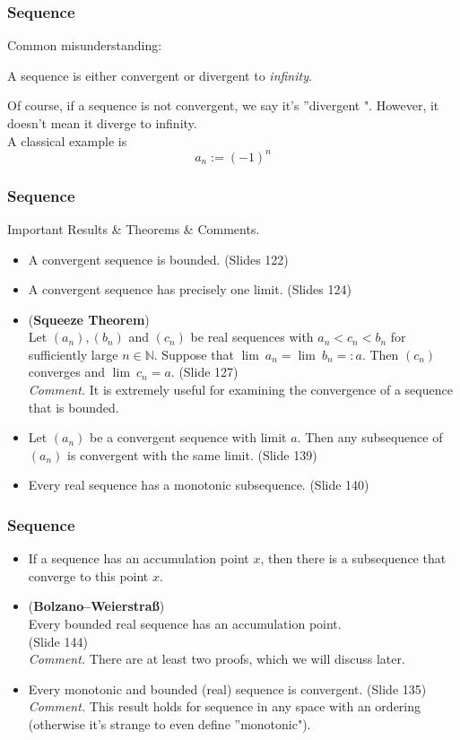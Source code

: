 \documentclass[12pt, t]{beamer}
\renewcommand{\emph}[1]{{\color{Turquoise3}\textsl{#1}}}
\begin{document}
\begin{frame}
    \frametitle{Sequence}
Common misunderstanding:
\begin{center}
    A sequence is either convergent or divergent to \emph{infinity}.
\end{center}
\hspace{1em} Of course, if a sequence is not convergent, we say it's ''divergent ". However, 
it doesn't mean it diverge to infinity.\\
\hspace{1em}A classical example is 
\begin{equation*}
    a_n:=(-1)^n
\end{equation*}
\end{frame}

\begin{frame}
    \frametitle{Sequence}
Important Results \& Theorems \& Comments.
\begin{itemize}
    \item A convergent sequence is bounded. (Slides 122)
    \item A convergent sequence has precisely one limit. (Slides 124)
    \item (\textbf{Squeeze Theorem}) \\Let $(a_n),(b_n)$ and $(c_n)$ be real sequences with $a_n<c_n<b_n$ 
        for sufficiently large $n\in\mathbb{N}$. Suppose that $\lim\ a_n=\lim\ b_n=:a$. Then 
        $(c_n)$ converges and $\lim\ c_n=a$. (Slide 127)\\
        \emph{Comment.} It is extremely useful for examining the convergence of a sequence that is bounded.
    \item Let $(a_n)$ be a convergent sequence with limit $a$. Then any subsequence of $(a_n)$ 
        is convergent with the same limit. (Slide 139)
    \item Every real sequence has a monotonic subsequence. (Slide 140)
\end{itemize}
\end{frame}

\begin{frame}
    \frametitle{Sequence}
    \begin{itemize}
        \item If a sequence has an accumulation point $x$, then there is a subsequence that converge to this point $x$.
        \item (\textbf{Bolzano--Weierstraß})\\ Every bounded real sequence has an accumulation point. \\(Slide 144)\\
            \emph{Comment.} There are at least two proofs, which we will discuss later.
        \item Every monotonic and bounded (real) sequence is convergent. (Slide 135)\\
            \emph{Comment.} This result holds for sequence in any space with an ordering (otherwise it's 
            strange to even define ''monotonic").
    \end{itemize}
\end{frame}
\end{document}
